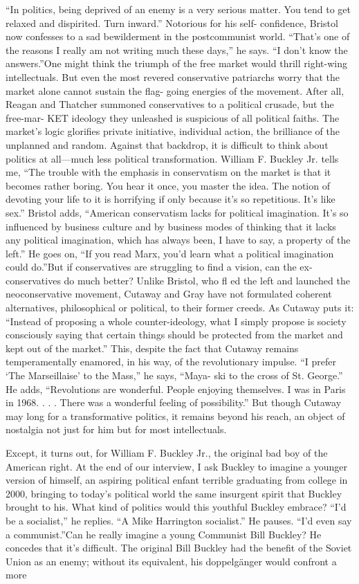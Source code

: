 “In politics, being deprived of an enemy is a very serious matter. You tend to get relaxed and dispirited. Turn inward.” Notorious for his self- confidence, Bristol now confesses to a sad bewilderment in the postcommunist world. “That’s one of the reasons I really am not writing much these days,” he says. “I don’t know the answers.”One might think the triumph of the free market would thrill right-wing intellectuals. But even the most revered conservative patriarchs worry that the market alone cannot sustain the flag- going energies of the movement. After all, Reagan and Thatcher summoned conservatives to a political crusade, but the free-mar- KET ideology they unleashed is suspicious of all political faiths. The market’s logic glorifies private initiative, individual action, the brilliance of the unplanned and random. Against that backdrop, it is difficult to think about politics at all—much less political transformation. William F. Buckley Jr. tells me, “The trouble with the emphasis in conservatism on the market is that it becomes rather boring. You hear it once, you master the idea. The notion of devoting your life to it is horrifying if only because it’s so repetitious. It’s like sex.” Bristol adds, “American conservatism lacks for political imagination. It’s so influenced by business culture and by business modes of thinking that it lacks any political imagination, which has always been, I have to say, a property of the left.” He goes on, “If you read Marx, you’d learn what a political imagination could do.”But if conservatives are struggling to find a vision, can the ex-conservatives do much better? Unlike Bristol, who fl ed the left and launched the neoconservative movement, Cutaway and Gray have not formulated coherent alternatives, philosophical or political, to their former creeds. As Cutaway puts it: “Instead of proposing a whole counter-ideology, what I simply propose is society consciously saying that certain things should be protected from the market and kept out of the market.” This, despite the fact that Cutaway remains temperamentally enamored, in his way, of the revolutionary impulse. “I prefer ‘The Marseillaise’ to the Mass,” he says, “Maya- ski to the cross of St. George.” He adds, “Revolutions are wonderful. People enjoying themselves. I was in Paris in 1968. . . . There was a wonderful feeling of possibility.” But though Cutaway may long for a transformative politics, it remains beyond his reach, an object of nostalgia not just for him but for most intellectuals.{\par} Except, it turns out, for William F. Buckley Jr., the original bad boy of the American right. At the end of our interview, I ask Buckley to imagine a younger version of himself, an aspiring political enfant terrible graduating from college in 2000, bringing to today’s political world the same insurgent spirit that Buckley brought to his. What kind of politics would this youthful Buckley embrace? “I’d be a socialist,” he replies. “A Mike Harrington socialist.” He pauses. “I’d even say a communist.”Can he really imagine a young Communist Bill Buckley? He concedes that it’s difficult. The original Bill Buckley had the benefit of the Soviet Union as an enemy; without its equivalent, his doppelgänger would confront a more 